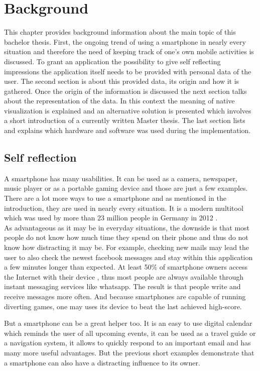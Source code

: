 \chapter{Background}
\label{cha:background}
This chapter provides background information about the main topic of this bachelor thesis. First, the ongoing trend of using a smartphone in nearly every situation and therefore the need of keeping track of one's own mobile activities is discussed. To grant an application the possibility to give self reflecting impressions the application itself needs to be provided with personal data of the user. The second section is about this provided data, its origin and how it is gathered. Once the origin of the information is discussed the next section talks about the representation of the data. In this context the meaning of native visualization is explained and an alternative solution is presented which involves a short introduction of a currently written Master thesis. The last section lists and explains which hardware and software was used during the implementation.

\section{Self reflection}
A  smartphone has many usabilities. It can be used as a camera, newspaper, music player or as a portable gaming device and those are just a few examples. There are a lot more ways to use a smartphone and as mentioned in the introduction, they are used in nearly every situation. It is a modern multitool which was used by more than 23 million people in Germany in 2012 \cite{gstatistic}.\\
As  advantageous as it may be in everyday situations, the downside is that most people do not know how much time they spend on their phone and thus do not know how distracting it may be.
For example, checking new mails may lead the user to also check the newest facebook messages and stay within this application a few minutes longer than expected. At least 50\% of smartphone owners access the Internet with their device \cite{gstatistic}, thus most people are always available through instant messaging services like whatsapp. The result is that people write and receive messages more often. And because smartphones are capable of running diverting games, one may uses its device to beat the last achieved high-score.

But a smartphone  can be a great helper too. It is an easy to use digital calendar which reminds the user of all upcoming events, it can be used as a travel guide or a navigation system, it allows to quickly respond to an important email and has many more useful advantages. But the previous short examples demonstrate that a smartphone can also have a distracting influence to its owner.

